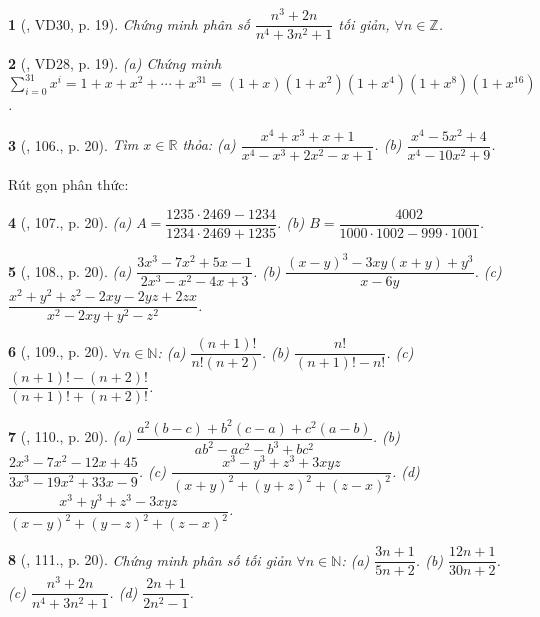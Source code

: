 \documentclass{article}
\newtheorem{baitoan}{}
\begin{document}
\begin{baitoan}[\cite{Binh_Toan_8_tap_1}, VD30, p. 19]
	Chứng minh phân số $\dfrac{n^3 + 2n}{n^4 + 3n^2 + 1}$ tối giản, $\forall n\in\mathbb{Z}$.
\end{baitoan}

\begin{baitoan}[\cite{Binh_Toan_8_tap_1}, VD28, p. 19]
	(a) Chứng minh $\sum_{i=0}^{31} x^i = 1 + x + x^2 + \cdots + x^{31} = (1 + x)(1 + x^2)(1 + x^4)(1 + x^8)(1 + x^{16})$.
\end{baitoan}

\begin{baitoan}[\cite{Binh_Toan_8_tap_1}, 106., p. 20]
	Tìm $x\in\mathbb{R}$ thỏa: (a) $\dfrac{x^4 + x^3 + x + 1}{x^4 - x^3 + 2x^2 - x + 1}$. (b) $\dfrac{x^4 - 5x^2 + 4}{x^4 - 10x^2 + 9}$.
\end{baitoan}
Rút gọn phân thức:

\begin{baitoan}[\cite{Binh_Toan_8_tap_1}, 107., p. 20]
	(a) $A = \dfrac{1235\cdot2469 - 1234}{1234\cdot2469 + 1235}$. (b) $B = \dfrac{4002}{1000\cdot1002 - 999\cdot1001}$.
\end{baitoan}

\begin{baitoan}[\cite{Binh_Toan_8_tap_1}, 108., p. 20]
	(a) $\dfrac{3x^3 - 7x^2 + 5x - 1}{2x^3 - x^2 - 4x + 3}$. (b) $\dfrac{(x - y)^3 - 3xy(x + y) + y^3}{x - 6y}$. (c) $\dfrac{x^2 + y^2 + z^2 - 2xy - 2yz + 2zx}{x^2 - 2xy + y^2 - z^2}$.
\end{baitoan}

\begin{baitoan}[\cite{Binh_Toan_8_tap_1}, 109., p. 20]
	$\forall n\in\mathbb{N}$: (a) $\dfrac{(n + 1)!}{n!(n + 2)}$. (b) $\dfrac{n!}{(n + 1)! - n!}$. (c) $\dfrac{(n + 1)! - (n + 2)!}{(n + 1)! + (n + 2)!}$.
\end{baitoan}

\begin{baitoan}[\cite{Binh_Toan_8_tap_1}, 110., p. 20]
	(a) $\dfrac{a^2(b - c) + b^2(c - a) + c^2(a - b)}{ab^2 - ac^2 - b^3 + bc^2}$. (b) $\dfrac{2x^3 - 7x^2 - 12x + 45}{3x^3 - 19x^2 + 33x - 9}$. (c) $\dfrac{x^3 - y^3 + z^3 + 3xyz}{(x + y)^2 + (y + z)^2 + (z - x)^2}$. (d) $\dfrac{x^3 + y^3 + z^3 - 3xyz}{(x - y)^2 + (y - z)^2 + (z - x)^2}$.
\end{baitoan}

\begin{baitoan}[\cite{Binh_Toan_8_tap_1}, 111., p. 20]
	Chứng minh phân số tối giản $\forall n\in\mathbb{N}$: (a) $\dfrac{3n + 1}{5n + 2}$. (b) $\dfrac{12n + 1}{30n + 2}$. (c) $\dfrac{n^3 + 2n}{n^4 + 3n^2 + 1}$. (d) $\dfrac{2n + 1}{2n^2 - 1}$.
\end{baitoan}
\end{document}
